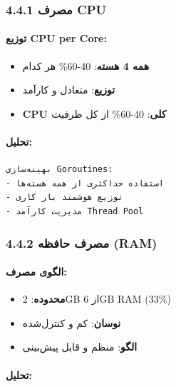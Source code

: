 \documentclass[
]{article}
\providecommand{\tightlist}{%
  \setlength{\itemsep}{0pt}\setlength{\parskip}{0pt}}
\begin{document}
\subsubsection{4.4.1 مصرف CPU}\label{ux645ux635ux631ux641-cpu-2}

\paragraph{توزیع CPU per
Core:}\label{ux62aux648ux632ux6ccux639-cpu-per-core-2}

\begin{itemize}
\tightlist
\item
  \textbf{همه 4 هسته}: 40-60\% هر کدام
\item
  \textbf{توزیع}: متعادل و کارآمد
\item
  \textbf{CPU کلی}: 40-60\% از کل ظرفیت
\end{itemize}

\paragraph{تحلیل:}\label{ux62aux62dux644ux6ccux644-4}

\begin{verbatim}
بهینه‌سازی Goroutines:
- استفاده حداکثری از همه هسته‌ها
- توزیع هوشمند بار کاری
- مدیریت کارآمد Thread Pool
\end{verbatim}

\subsubsection{4.4.2 مصرف حافظه
(RAM)}\label{ux645ux635ux631ux641-ux62dux627ux641ux638ux647-ram-2}

\paragraph{الگوی
مصرف:}\label{ux627ux644ux6afux648ux6cc-ux645ux635ux631ux641-2}

\begin{itemize}
\tightlist
\item
  \textbf{محدوده}: 2GB از 6GB RAM (33\%)
\item
  \textbf{نوسان}: کم و کنترل‌شده
\item
  \textbf{الگو}: منظم و قابل پیش‌بینی
\end{itemize}

\paragraph{تحلیل:}\label{ux62aux62dux644ux6ccux644-5}
\end{document}
